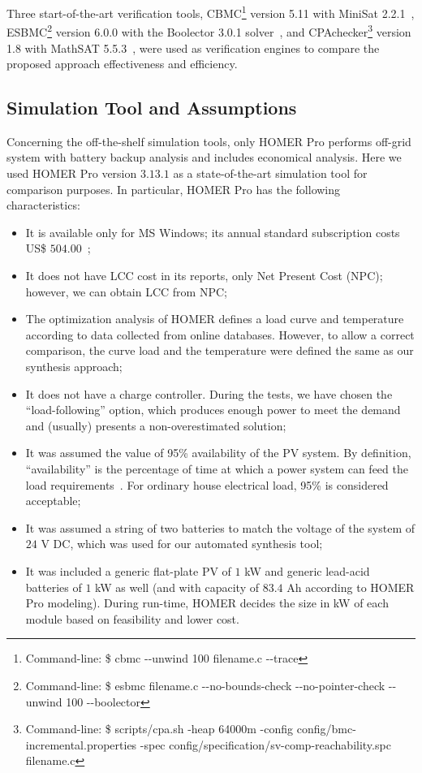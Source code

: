 \documentclass[runningheads]{llncs}
\begin{document}
Three start-of-the-art verification tools, CBMC\footnote{Command-line: \$ cbmc -\phantom{}-unwind 100 filename.c -\phantom{}-trace} version 5.11 with MiniSat 2.2.1~\cite{Kroening}, ESBMC\footnote{Command-line: \$ esbmc filename.c -\phantom{}-no-bounds-check -\phantom{}-no-pointer-check -\phantom{}-unwind 100 -\phantom{}-boolector} version 6.0.0 with the  Boolector 3.0.1 solver~\cite{Brummayer}, and CPAchecker\footnote{Command-line: \$ scripts/cpa.sh -heap 64000m -config config/bmc-incremental.properties -spec config/specification/sv-comp-reachability.spc filename.c} version 1.8 with MathSAT 5.5.3~\cite{mathsat5}, were used as verification engines to compare the proposed approach effectiveness and efficiency. 

\subsection{Simulation Tool and Assumptions}

Concerning the off-the-shelf simulation tools, only HOMER Pro performs off-grid system with battery backup analysis and includes economical analysis. Here we used HOMER Pro version $3.13.1$ as a state-of-the-art simulation tool for comparison purposes. In particular, HOMER Pro has the following characteristics:

\begin{itemize}
\item It is available only for MS Windows; its annual standard subscription costs US\$ $504.00$~\cite{HOMER}; 
\item It does not have LCC cost in its reports, only Net Present Cost (NPC); however, we can obtain LCC from NPC; 
\item The optimization analysis of HOMER defines a load curve and temperature according to data collected from online databases. However, to allow a correct comparison, the curve load and the temperature were defined the same as our synthesis approach; 
\item It does not have a charge controller. During the tests, we have chosen the ``load-following'' option, which produces enough power to meet the demand~\cite{HOMER} and (usually) presents a non-overestimated solution; 
\item It was assumed the value of 95\% availability of the PV system. By definition, ``availability'' is the percentage of time at which a power system can feed the load requirements~\cite{Khatib2014}. For ordinary house electrical load, 95\% is considered acceptable;
\item It was assumed a string of two batteries to match the voltage of the system of $24$ V DC, which was used for our automated synthesis tool; 
\item It was included a generic flat-plate PV of $1$ kW and generic lead-acid batteries of $1$ kW as well (and with capacity of $83.4$ Ah according to HOMER Pro modeling). During run-time, HOMER decides the size in kW of each module based on feasibility and lower cost.
\end{itemize}
\end{document}
